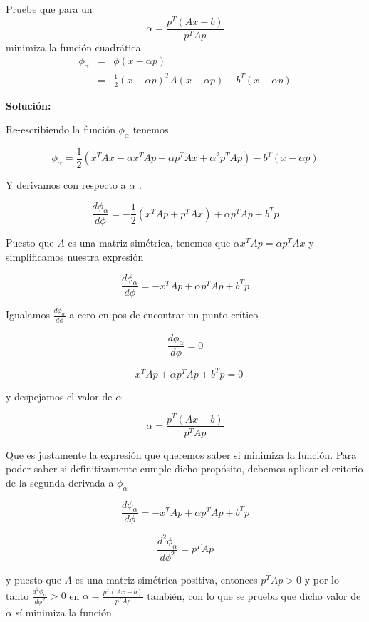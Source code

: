 Pruebe que para un $$ \alpha = \frac{p^T(Ax-b)}{p^TAp} $$ minimiza la función cuadrática
$$
\begin{array}{lcll}
    \phi_{\alpha} & = & \phi (x - \alpha p ) \\
                & = & \frac{1}{2}(x-\alpha p)^TA(x-\alpha p)-b^T(x-\alpha p)
\end{array}
$$ 

\textbf{Solución:\\}

Re-escribiendo la función $\phi_{\alpha}$ tenemos

$$
\phi_{\alpha} = \frac{1}{2} (x^TAx - \alpha x^TAp - \alpha p^TAx + \alpha^2 p^TAp)-b^T(x-\alpha p)
$$

Y derivamos con respecto a $\alpha$ .

$$
  \frac{d\phi_{\alpha}}{d\phi} = -\frac{1}{2} (x^TAp + p^TAx) + \alpha p^TAp + b^Tp
$$

Puesto que $A$ es una matriz simétrica, tenemos que $\alpha x^TAp = \alpha p^TAx$ y simplificamos nuestra expresión

$$
  \frac{d\phi_{\alpha}}{d\phi} = -x^TAp + \alpha p^TAp + b^Tp
$$

Igualamos $ \frac{d\phi_{\alpha}}{d\phi}$ a cero en pos de encontrar un punto crítico

$$
  \frac{d\phi_{\alpha}}{d\phi} = 0
$$

$$
   -x^TAp + \alpha p^TAp + b^Tp = 0
$$

y despejamos el valor de $\alpha$

$$ \alpha = \frac{p^T(Ax-b)}{p^TAp} $$

Que es justamente la expresión que queremos saber si minimiza la función. Para poder saber si definitivamente cumple dicho propósito, debemos aplicar el criterio de la segunda derivada a $\phi_{\alpha}$

$$
  \frac{d\phi_{\alpha}}{d\phi} = -x^TAp + \alpha p^TAp + b^Tp
$$

$$
  \frac{d^2\phi_{\alpha}}{d\phi^2} = p^TAp
$$

y puesto que $A$ es una matriz simétrica positiva, entonces $p^TAp>0$ y por lo tanto $\frac{d^2\phi_{\alpha}}{d\phi^2}>0$ en $\alpha=\frac{p^T(Ax-b)}{p^TAp}$ también, con lo que se prueba que dicho valor de $\alpha$ sí minimiza la función.